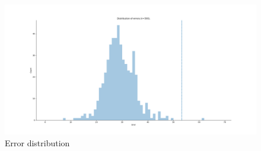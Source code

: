 

    
    


\begin{figure}
    \centering
    \includegraphics[width=\linewidth]{imgs_andy/error_distribution_test_set_ensemble_simetrized.png}
    \caption{Error distribution}
    \label{fig:error_dist}
\end{figure}

